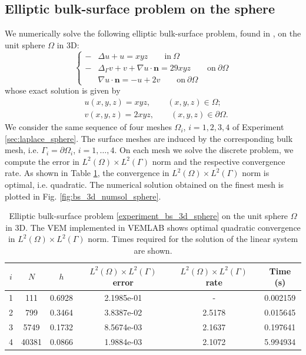 \documentclass[a4paper]{article}
\newcommand{\boldn}{\boldsymbol{n}}
\begin{document}
\subsection{Elliptic bulk-surface problem on the sphere}
We numerically solve the following elliptic bulk-surface problem,  found in \cite{elliott2013finite}, on the unit sphere $\Omega$ in 3D:
\begin{equation}
\label{experiment_bs_3d_sphere}
\begin{cases}
-&\Delta u + u = xyz \qquad \text{in}\ \Omega\\
-&\Delta_\Gamma v + v +\nabla u\cdot\boldn = 29xyz \qquad \text{on}\ \partial \Omega\\
&\nabla u \cdot \boldn = -u + 2v   \qquad \text{on}\ \partial \Omega
\end{cases}
\end{equation}
whose exact solution is given by
\begin{align*}
&u(x,y,z) = xyz, \qquad (x,y,z) \in \Omega;\\
&v(x,y,z) = 2xyz, \qquad (x,y,z) \in \partial\Omega.
\end{align*}
We consider the same sequence of four meshes $\Omega_i$, $i=1,2,3,4$ of Experiment \ref{sec:laplace_sphere}.  The surface meshes are induced by the corresponding bulk mesh, i.e. $\Gamma_i = \partial \Omega_i$, $i=1,\dots,4$. On each mesh we solve the discrete problem,  we compute the error in $L^2(\Omega)\times L^2(\Gamma)$ norm and the respective convergence rate. As shown in Table \ref{tab:bs_3d_convergence_sphere}, the convergence in $L^2(\Omega)\times L^2(\Gamma)$ norm is optimal, i.e. quadratic. The numerical solution obtained on the finest mesh is plotted in Fig.  \ref{fig:bs_3d_numsol_sphere}.

\begin{table}[H]
\caption{Elliptic bulk-surface problem \eqref{experiment_bs_3d_sphere} on the unit sphere $\Omega$ in 3D. The VEM implemented in VEMLAB shows optimal quadratic convergence in $L^2(\Omega) \times L^2(\Gamma)$ norm. Times required for the solution of the linear system are shown.}
\begin{center}
\begin{tabular}{c | c | c | c | c | c}
$i$ & $N$ & $h$ & $L^2(\Omega)\times L^2(\Gamma)$ error & $L^2(\Omega)\times L^2(\Gamma)$ rate & Time (s)\\
\hline
1 & 111 & 0.6928 &   2.1985e-01 &  -   & 0.002159\\
2 & 799 & 0.3464 & 3.8387e-02 & 2.5178    & 0.015645\\
3 & 5749 & 0.1732 & 8.5674e-03 & 2.1637  & 0.197641  \\
4 & 40381 & 0.0866 &  1.9884e-03 & 2.1072 & 5.994934
\end{tabular}
\end{center}
\label{tab:bs_3d_convergence_sphere}
\end{table}
\end{document}
